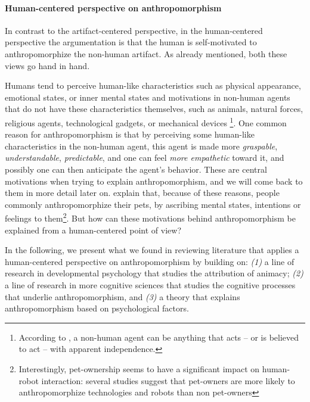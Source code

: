 \documentclass{frontiersSCNS} %
\begin{document}

\paragraph{Human-centered perspective on anthropomorphism\\}

In contrast to the artifact-centered perspective, in the human-centered
perspective the argumentation is that the human is self-motivated to
anthropomorphize the non-human artifact. As already mentioned, both these views
go hand in hand.

Humans tend to perceive human-like characteristics such as physical appearance,
emotional states, or inner mental states and motivations in non-human agents
that do not have these characteristics themselves, such as animals, natural
forces, religious agents, technological gadgets, or mechanical devices
\citep{epley_when_2008}\footnote{According to \citet{epley_when_2008}, a
non-human agent can be anything that acts -- or is believed to act -- with
apparent independence.}. One common reason for anthropomorphism is that by
perceiving some human-like characteristics in the non-human agent, this agent is
made more \emph{graspable}, \emph{understandable}, \emph{predictable}, and one
can feel \emph{more empathetic} toward it, and possibly one can then anticipate
the agent's behavior. These are central motivations when trying to explain
anthropomorphism, and we will come back to them in more detail later on.
\citet{eddy_attribution_1993} explain that, because of these reasons, people
commonly anthropomorphize their pets, by ascribing mental states, intentions or
feelings to them\footnote{Interestingly, pet-ownership seems to have a
significant impact on human-robot interaction: several studies suggest that
pet-owners are more likely to anthropomorphize technologies and robots than
non pet-owners}. But how can these motivations behind anthropomorphism be
explained from a human-centered point of view?

In the following, we present what we found in reviewing literature that applies a human-centered perspective on anthropomorphism by building on:
\textit{(1)} a line of research in developmental psychology that studies the attribution of animacy;
\textit{(2)} a line of research in more cognitive sciences that studies the cognitive processes that underlie anthropomorphism, and
\textit{(3)} a theory that explains anthropomorphism based on psychological factors. 
\end{document}
